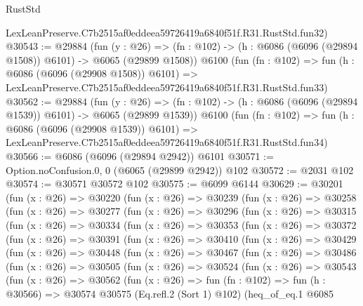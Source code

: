 \begin{lexlean}{RustStd}
\begin{coremodule}
    LexLeanPreserve.C7b2515af0eddeea59726419a6840f51f.R31.RustStd.fun32)
@30543 := @29884
    (fun (y : @26) =>
    (fn : @102) -> (h : @6086 (@6096 (@29894 @1508)) @6101) -> @6065 (@29899 @1508))
    @6100
    (fun (fn : @102) =>
    fun (h : @6086 (@6096 (@29908 @1508)) @6101) =>
    LexLeanPreserve.C7b2515af0eddeea59726419a6840f51f.R31.RustStd.fun33)
@30562 := @29884
    (fun (y : @26) =>
    (fn : @102) -> (h : @6086 (@6096 (@29894 @1539)) @6101) -> @6065 (@29899 @1539))
    @6100
    (fun (fn : @102) =>
    fun (h : @6086 (@6096 (@29908 @1539)) @6101) =>
    LexLeanPreserve.C7b2515af0eddeea59726419a6840f51f.R31.RustStd.fun34)
@30566 := @6086 (@6096 (@29894 @2942)) @6101
@30571 := Option.noConfusion.{0, 0} (@6065 (@29899 @2942)) @102
@30572 := @2031 @102
@30574 := @30571 @30572 @102
@30575 := @6099 @6144
@30629 := @30201
    (fun (x : @26) =>
    @30220
      (fun (x : @26) =>
      @30239
        (fun (x : @26) =>
        @30258
          (fun (x : @26) =>
          @30277
            (fun (x : @26) =>
            @30296
              (fun (x : @26) =>
              @30315
                (fun (x : @26) =>
                @30334
                  (fun (x : @26) =>
                  @30353
                    (fun (x : @26) =>
                    @30372
                      (fun (x : @26) =>
                      @30391
                        (fun (x : @26) =>
                        @30410
                          (fun (x : @26) =>
                          @30429
                            (fun (x : @26) =>
                            @30448
                              (fun (x : @26) =>
                              @30467
                                (fun (x : @26) =>
                                @30486
                                  (fun (x : @26) =>
                                  @30505
                                    (fun (x : @26) =>
                                    @30524
                                      (fun (x : @26) =>
                                      @30543
                                        (fun (x : @26) =>
                                        @30562
                                          (fun (x : @26) =>
                                          fun (fn : @102) =>
                                          fun (h : @30566) =>
                                          @30574
                                            @30575
                                            (Eq.refl.{2} (Sort 1) @102)
                                            (heq_of_eq.{1}
                                              @6085

\end{coremodule}
\end{lexlean}
